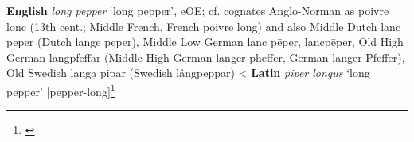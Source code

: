\begin{etymology}\label{ety:long pepper}
\textbf{English} \textit{long pepper} `long pepper', eOE; cf. cognates Anglo-Norman as poivre lonc (13th cent.; Middle French, French poivre long) and also Middle Dutch lanc peper (Dutch lange peper), Middle Low German lanc pēper, lancpēper, Old High German langpfeffar (Middle High German langer pheffer, German langer Pfeffer), Old Swedish langa pipar (Swedish långpeppar)
< \textbf{Latin} \textit{piper longus} `long pepper' [pepper-long]\footnote{\textcite[long pepper]{oed}}
\end{etymology}